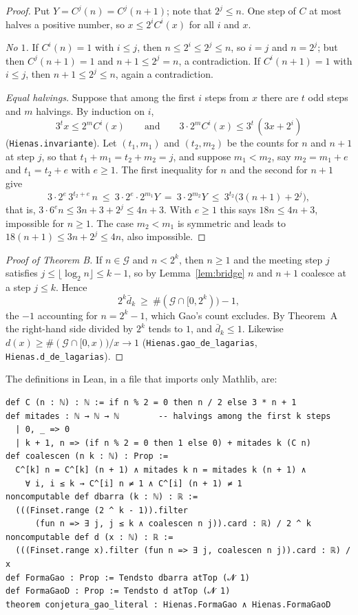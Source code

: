 \documentclass[11pt]{amsart}
\theoremstyle{definition}
\theoremstyle{remark}
\newcommand{\dbar}{\bar d}
\newcommand{\lean}[1]{\nolinkurl{#1}}
\begin{document}
\begin{proof}
Put $Y=C^{j}(n)=C^{j}(n+1)$; note that $2^j\le n$. One step of $C$ at most halves a positive number, so $x\le 2^iC^{i}(x)$ for all $i$ and $x$.

\emph{No $1$.} If $C^{i}(n)=1$ with $i\le j$, then $n\le2^i\le2^j\le n$, so $i=j$ and $n=2^j$; but then $C^{j}(n+1)=1$ and $n+1\le 2^j=n$, a contradiction. If $C^{i}(n+1)=1$ with $i\le j$, then $n+1\le 2^j\le n$, again a contradiction.

\emph{Equal halvings.} Suppose that among the first $i$ steps from $x$ there are $t$ odd steps and $m$ halvings. By induction on $i$,
\begin{equation}\label{eq:invariant}
3^{t}x\le 2^{m}C^{i}(x)\qquad\text{and}\qquad 3\cdot 2^{m}C^{i}(x)\le 3^{t}\,(3x+2^{i})
\end{equation}
(\lean{Hienas.invariante}). Let $(t_1,m_1)$ and $(t_2,m_2)$ be the counts for $n$ and $n+1$ at step $j$, so that $t_1+m_1=t_2+m_2=j$, and suppose $m_1<m_2$, say $m_2=m_1+e$ and $t_1=t_2+e$ with $e\ge1$. The first inequality for $n$ and the second for $n+1$ give
\[
3\cdot 2^{e}\,3^{t_2+e}\,n\ \le\ 3\cdot2^{e}\cdot 2^{m_1}Y\ =\ 3\cdot 2^{m_2}Y\ \le\ 3^{t_2}\bigl(3(n+1)+2^{j}\bigr),
\]
that is, $3\cdot6^{e}n\le 3n+3+2^j\le 4n+3$. With $e\ge1$ this says $18n\le 4n+3$, impossible for $n\ge1$. The case $m_2<m_1$ is symmetric and leads to $18(n+1)\le 3n+2^j\le 4n$, also impossible.
\end{proof}

\begin{proof}[Proof of Theorem B]
If $n\in\mathcal G$ and $n<2^k$, then $n\ge1$ and the meeting step $j$ satisfies $j\le\lfloor\log_2 n\rfloor\le k-1$, so by Lemma~\ref{lem:bridge} $n$ and $n+1$ coalesce at a step $j\le k$. Hence
\[
2^k\dbar_k\ \ge\ \#(\mathcal G\cap[0,2^k))-1,
\]
the $-1$ accounting for $n=2^k-1$, which Gao's count excludes. By Theorem~A the right-hand side divided by $2^k$ tends to $1$, and $\dbar_k\le 1$. Likewise $d(x)\ge \#(\mathcal G\cap[0,x))/x\to1$ (\lean{Hienas.gao_de_lagarias}, \lean{Hienas.d_de_lagarias}).
\end{proof}

The definitions in Lean, in a file that imports only Mathlib, are:

\begin{Verbatim}[fontsize=\small]
def C (n : ℕ) : ℕ := if n % 2 = 0 then n / 2 else 3 * n + 1
def mitades : ℕ → ℕ → ℕ        -- halvings among the first k steps
  | 0, _ => 0
  | k + 1, n => (if n % 2 = 0 then 1 else 0) + mitades k (C n)
def coalescen (n k : ℕ) : Prop :=
  C^[k] n = C^[k] (n + 1) ∧ mitades k n = mitades k (n + 1) ∧
    ∀ i, i ≤ k → C^[i] n ≠ 1 ∧ C^[i] (n + 1) ≠ 1
noncomputable def dbarra (k : ℕ) : ℝ :=
  (((Finset.range (2 ^ k - 1)).filter
      (fun n => ∃ j, j ≤ k ∧ coalescen n j)).card : ℝ) / 2 ^ k
noncomputable def d (x : ℕ) : ℝ :=
  (((Finset.range x).filter (fun n => ∃ j, coalescen n j)).card : ℝ) / x
def FormaGao : Prop := Tendsto dbarra atTop (𝓝 1)
def FormaGaoD : Prop := Tendsto d atTop (𝓝 1)
theorem conjetura_gao_literal : Hienas.FormaGao ∧ Hienas.FormaGaoD
\end{Verbatim}
\end{document}
